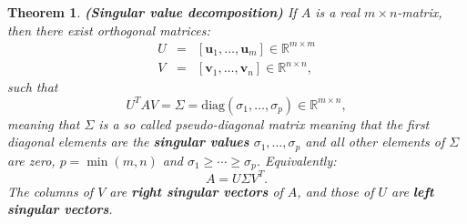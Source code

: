 \documentclass[a4paper,11pt]{report}
\newtheorem{theorem}{Theorem}[section]
\newcommand{\R}{{\mathbb R}}
\begin{document}
\begin{theorem} \textbf{(Singular value decomposition)}
If $A$ is a real $m \times n$-matrix, then there exist orthogonal matrices:
\begin{eqnarray*}
  U &=& [\mathbf{u}_1,\ldots, \mathbf{u}_m] \in \R^{m\times m}\\
  V &=& [\mathbf{v}_1,\ldots, \mathbf{v}_n] \in \R^{n\times n},
\end{eqnarray*}
such that
$$U^TAV = \Sigma = \text{diag}(\sigma_1,\ldots,\sigma_p) \in \R^{m \times n},$$
meaning that $\Sigma$ is a so called pseudo-diagonal matrix meaning that the first diagonal elements are the \textbf{singular values} $\sigma_1, \ldots, \sigma_p$ and all other elements of $\Sigma$ are zero, $p = \min(m,n)$ and $\sigma_1 \geq \cdots \geq \sigma_p$. 
Equivalently:
$$A = U\Sigma V^T.$$
The columns of $V$ are \textbf{right singular vectors} of $A$, and those of $U$ 
are \textbf{left singular vectors}.
\end{theorem}
\end{document}
